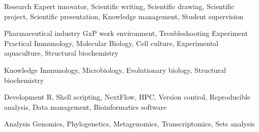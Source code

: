 

\begin{cvskills}

  \cvskill
    {Research} %
    {Expert innovator, Scientific writing, Scientific drawing, Scientific project, Scientific presentation, \hfill \break Knowledge management, Student supervision} %
    
  \cvskill
    {Pharmaceutical industry} %
    {GxP work environment, Troubleshooting} %
  \cvskill
    {Experiment} %
    {Practical Immunology, Molecular Biology, Cell culture, Experimental aquaculture, Structural biochemistry} %
    
  \cvskill
    {Knowledge} %
    {Immunology, Microbiology, Evolutionary biology, Structural biochemistry} %
    
  \cvskill
    {Development} %
    {R, Shell scripting, NextFlow, HPC, Version control, Reproducible analysis, Data management, Bioinformatics software} %
    
  \cvskill
    {Analysis} %
    {Genomics, Phylogenetics, Metagenomics, Transcriptomics, Sets analysis} %

\end{cvskills}